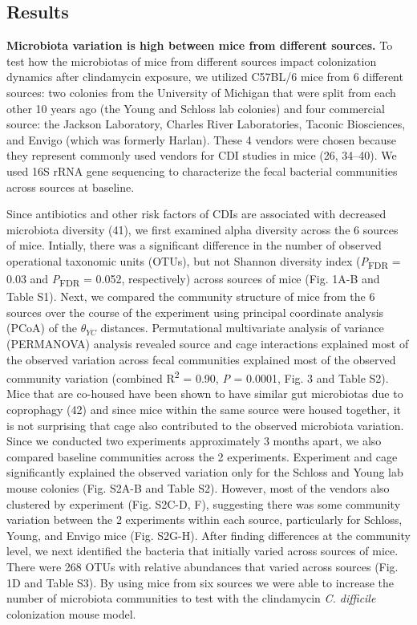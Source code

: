 \documentclass[11pt,]{article}
\begin{document}
\subsection{Results}\label{results}

\textbf{Microbiota variation is high between mice from different
sources.} To test how the microbiotas of mice from different sources
impact colonization dynamics after clindamycin exposure, we utilized
C57BL/6 mice from 6 different sources: two colonies from the University
of Michigan that were split from each other 10 years ago (the Young and
Schloss lab colonies) and four commercial source: the Jackson
Laboratory, Charles River Laboratories, Taconic Biosciences, and Envigo
(which was formerly Harlan). These 4 vendors were chosen because they
represent commonly used vendors for CDI studies in mice (26, 34--40). We
used 16S rRNA gene sequencing to characterize the fecal bacterial
communities across sources at baseline.

Since antibiotics and other risk factors of CDIs are associated with
decreased microbiota diversity (41), we first examined alpha diversity
across the 6 sources of mice. Intially, there was a significant
difference in the number of observed operational taxonomic units (OTUs),
but not Shannon diversity index (\emph{P}\textsubscript{FDR} = 0.03 and
\emph{P}\textsubscript{FDR} = 0.052, respectively) across sources of
mice (Fig. 1A-B and Table S1). Next, we compared the community structure
of mice from the 6 sources over the course of the experiment using
principal coordinate analysis (PCoA) of the \(\theta_{YC}\) distances.
Permutational multivariate analysis of variance (PERMANOVA) analysis
revealed source and cage interactions explained most of the observed
variation across fecal communities explained most of the observed
community variation (combined R\textsuperscript{2} = 0.90, \emph{P} =
0.0001, Fig. 3 and Table S2). Mice that are co-housed have been shown to
have similar gut microbiotas due to coprophagy (42) and since mice
within the same source were housed together, it is not surprising that
cage also contributed to the observed microbiota variation. Since we
conducted two experiments approximately 3 months apart, we also compared
baseline communities across the 2 experiments. Experiment and cage
significantly explained the observed variation only for the Schloss and
Young lab mouse colonies (Fig. S2A-B and Table S2). However, most of the
vendors also clustered by experiment (Fig. S2C-D, F), suggesting there
was some community variation between the 2 experiments within each
source, particularly for Schloss, Young, and Envigo mice (Fig. S2G-H).
After finding differences at the community level, we next identified the
bacteria that initially varied across sources of mice. There were 268
OTUs with relative abundances that varied across sources (Fig. 1D and
Table S3). By using mice from six sources we were able to increase the
number of microbiota communities to test with the clindamycin \emph{C.
difficile} colonization mouse model.
\end{document}
